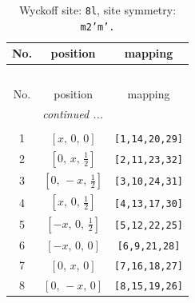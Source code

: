 \documentclass[fleqn,8pt]{jsarticle}
\begin{document}
\begin{longtable}{ccc}
\caption{Wyckoff site: {\tt 8l}, site symmetry: {\tt m2'm'.}}
 \\
 \hline \hline
No. & position & mapping \\ \hline \endfirsthead

\multicolumn{2}{l}{\tablename\ \thetable{}} \\
 \hline \hline
No. & position & mapping \\ \hline \endhead

 \hline \hline
\multicolumn{2}{r}{\footnotesize\it continued ...} \\ \endfoot

 \hline \hline
\multicolumn{2}{r}{} \\ \endlastfoot

1 & $\left[ x,\, 0,\, 0 \right]$ & {\tt [1,14,20,29]} \\ \hline
2 & $\left[ 0,\, x,\, \frac{1}{2} \right]$ & {\tt [2,11,23,32]} \\ \hline
3 & $\left[ 0,\, - x,\, \frac{1}{2} \right]$ & {\tt [3,10,24,31]} \\ \hline
4 & $\left[ x,\, 0,\, \frac{1}{2} \right]$ & {\tt [4,13,17,30]} \\ \hline
5 & $\left[ - x,\, 0,\, \frac{1}{2} \right]$ & {\tt [5,12,22,25]} \\ \hline
6 & $\left[ - x,\, 0,\, 0 \right]$ & {\tt [6,9,21,28]} \\ \hline
7 & $\left[ 0,\, x,\, 0 \right]$ & {\tt [7,16,18,27]} \\ \hline
8 & $\left[ 0,\, - x,\, 0 \right]$ & {\tt [8,15,19,26]} \\
\end{longtable}
\renewcommand{\arraystretch}{1.2}
\end{document}
